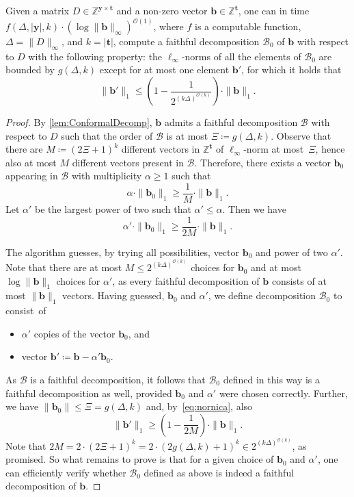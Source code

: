 \documentclass{theoretics}
\renewcommand{\leq}{\leqslant}
\renewcommand{\geq}{\geqslant}
\newcommand{\Bb}{\mathcal{B}}
\newcommand{\Z}{\mathbb{Z}}
\newcommand{\tup}[1]{{\mathbf{#1}}}
\newcommand{\yy}{\tup y}
\newcommand{\tv}{\tup t}
\newcommand{\bb}{\tup b}
\newcommand{\matrices}[3]{#1^{#2\times #3}}
\newcommand{\Oh}{{\mathcal{O}}}
\begin{document}
\begin{lemma}\label{lem:ComputingOneStepDecomp}
Given a matrix $D\in \matrices{\Z}{\yy}{\tv}$ and a non-zero vector $\bb\in \Z^{\tv}$, one can in time $f(\Delta,|\yy|,k)\cdot (\log \|\bb\|_\infty)^{\Oh(1)}$, where $f$ is a computable function, $\Delta=\|D\|_\infty$, and $k=|\tv|$, compute a faithful decomposition $\Bb_0$ of $\bb$ with respect to $D$ with the following property: the $\ell_\infty$-norms of all the elements of $\Bb_0$ are bounded by $g(\Delta,k)$ except for at most one element $\bb'$, for which it holds that
$$\|\bb'\|_1\leq \left(1-\frac{1}{2^{(k\Delta)^{\Oh(k)}}}\right)\cdot \|\bb\|_1.$$
\end{lemma}
\begin{proof}
By \cref{lem:ConformalDecomp}, $\bb$ admits a faithful decomposition $\Bb$ with respect to $D$ such that the order of $\Bb$ is at most $\Xi\coloneqq g(\Delta,k)$. Observe that there are $M\coloneqq (2\Xi+1)^k$ different vectors in $\Z^\tv$ of $\ell_\infty$-norm at most~$\Xi$, hence also at most $M$ different vectors present in $\Bb$. Therefore, there exists a vector $\bb_0$ appearing in $\Bb$ with multiplicity $\alpha\geq 1$ such that
$$\alpha\cdot \|\bb_0\|_1\geq \frac{1}{M}\cdot \|\bb\|_1.$$
Let $\alpha'$ be the largest power of two such that $\alpha'\leq \alpha$. Then we have
\begin{equation}\label{eq:nornica}\alpha'\cdot \|\bb_0\|_1\geq \frac{1}{2M}\cdot \|\bb\|_1.
\end{equation}

The algorithm guesses, by trying all possibilities, vector $\bb_0$ and power of two $\alpha'$. Note that there are at most $M\leq 2^{(k\Delta)^{\Oh(k)}}$ choices for $\bb_0$ and at most $\log \|\bb\|_1$ choices for $\alpha'$, as every faithful decomposition of $\bb$ consists of at most $\|\bb\|_1$ vectors. Having guessed, $\bb_0$ and $\alpha'$, we define decomposition $\Bb_0$ to consist~of
\begin{itemize}[nosep]
    \item $\alpha'$ copies of the vector $\bb_0$, and
    \item vector $\bb'\coloneqq \bb-\alpha'\bb_0$.
\end{itemize}
As $\Bb$ is a faithful decomposition, it follows that $\Bb_0$ defined in this way is a faithful decomposition as well, provided $\bb_0$ and $\alpha'$ were chosen correctly. Further,  we have $\|\bb_0\|\leq \Xi=g(\Delta,k)$ and, by~\cref{eq:nornica}, also
$$\|\bb'\|_1 \geq \left(1-\frac{1}{2M}\right)\cdot \|\bb\|_1.$$
Note that $2M=2\cdot (2\Xi+1)^k=2\cdot (2g(\Delta,k)+1)^k\in 2^{(k\Delta)^{\Oh(k)}}$, as promised.
So what remains to prove is that for a given choice of $\bb_0$ and $\alpha'$, one can efficiently verify whether $\Bb_0$ defined as above is indeed a faithful decomposition of $\bb$.


\end{proof}
\end{document}
